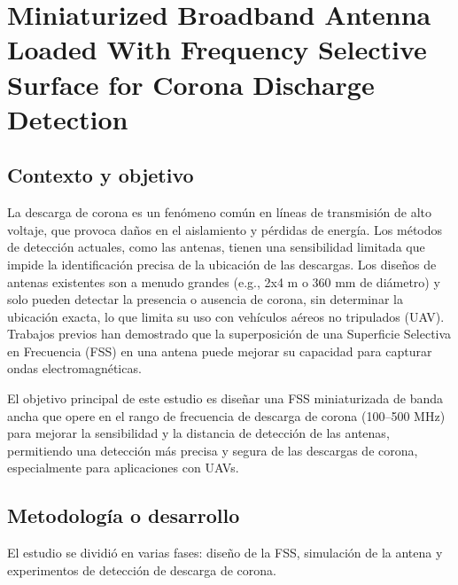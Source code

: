 \documentclass[11pt,a4paper]{article}
\begin{document}
\newpage
\section{Miniaturized Broadband Antenna Loaded With Frequency Selective Surface for Corona Discharge Detection}

\subsection*{Contexto y objetivo}
La descarga de corona es un fenómeno común en líneas de transmisión de alto voltaje, que provoca daños en el aislamiento y pérdidas de energía. Los métodos de detección actuales, como las antenas, tienen una sensibilidad limitada que impide la identificación precisa de la ubicación de las descargas. Los diseños de antenas existentes son a menudo grandes (e.g., 2x4 m o 360 mm de diámetro) y solo pueden detectar la presencia o ausencia de corona, sin determinar la ubicación exacta, lo que limita su uso con vehículos aéreos no tripulados (UAV). Trabajos previos han demostrado que la superposición de una Superficie Selectiva en Frecuencia (FSS) en una antena puede mejorar su capacidad para capturar ondas electromagnéticas.

El objetivo principal de este estudio es diseñar una FSS miniaturizada de banda ancha que opere en el rango de frecuencia de descarga de corona (100–500 MHz) para mejorar la sensibilidad y la distancia de detección de las antenas, permitiendo una detección más precisa y segura de las descargas de corona, especialmente para aplicaciones con UAVs.

\subsection*{Metodología o desarrollo}
El estudio se dividió en varias fases: diseño de la FSS, simulación de la antena y experimentos de detección de descarga de corona.
\end{document}
